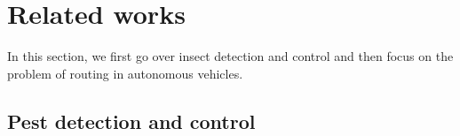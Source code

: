 \section{Related works}

In this section, we first go over insect detection and control and then focus on the problem of routing in autonomous vehicles.

\subsection{Pest detection and control}



